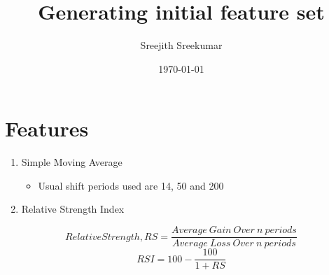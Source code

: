 \documentclass[11pt]{article}
\author{Sreejith Sreekumar}
\date{\today}
\title{Generating initial feature set}
\begin{document}
\maketitle
\tableofcontents


\section{Features}
\label{sec:org64cc0d5}

\begin{enumerate}
\item Simple Moving Average
\begin{itemize}
\item Usual shift periods used are 14, 50 and 200
\end{itemize}
\item Relative Strength Index
\end{enumerate}

\begin{equation}
     Relative Strength, RS = \frac{Average\ Gain\ Over\ n\ periods}{Average\ Loss\ Over\ n\ periods}
\end{equation}
\begin{equation}
     RSI = 100 - \frac{100}{1 + RS}
\end{equation}
\end{document}
